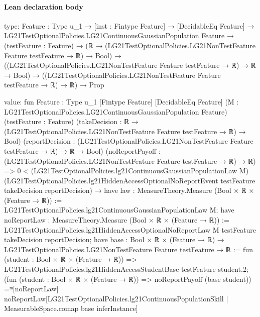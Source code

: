 \documentclass[10pt]{article}
\begin{document}
\paragraph{Lean declaration body}
\begin{ReviewVerbatim}
type:
{Feature : Type u_1} →
  [inst : Fintype Feature] →
    [DecidableEq Feature] →
      LG21TestOptionalPolicies.LG21ContinuousGaussianPopulation Feature →
        (testFeature : Feature) →
          (ℝ → (LG21TestOptionalPolicies.LG21NonTestFeature Feature testFeature → ℝ) → Bool) →
            ((LG21TestOptionalPolicies.LG21NonTestFeature Feature testFeature → ℝ) → ℝ → Bool) →
              ((LG21TestOptionalPolicies.LG21NonTestFeature Feature testFeature → ℝ) → ℝ) → Prop

value:
fun {Feature : Type u_1} [Fintype Feature] [DecidableEq Feature]
    (M : LG21TestOptionalPolicies.LG21ContinuousGaussianPopulation Feature) (testFeature : Feature)
    (takeDecision : ℝ → (LG21TestOptionalPolicies.LG21NonTestFeature Feature testFeature → ℝ) → Bool)
    (reportDecision : (LG21TestOptionalPolicies.LG21NonTestFeature Feature testFeature → ℝ) → ℝ → Bool)
    (noReportPayoff : (LG21TestOptionalPolicies.LG21NonTestFeature Feature testFeature → ℝ) → ℝ) =>
  0 <
      (LG21TestOptionalPolicies.lg21ContinuousGaussianPopulationLaw M)
        (LG21TestOptionalPolicies.lg21HiddenAccessOptionalNoReportEvent testFeature takeDecision reportDecision) →
    have law : MeasureTheory.Measure (Bool × ℝ × (Feature → ℝ)) :=
      LG21TestOptionalPolicies.lg21ContinuousGaussianPopulationLaw M;
    have noReportLaw : MeasureTheory.Measure (Bool × ℝ × (Feature → ℝ)) :=
      LG21TestOptionalPolicies.lg21HiddenAccessOptionalNoReportLaw M testFeature takeDecision reportDecision;
    have base : Bool × ℝ × (Feature → ℝ) → LG21TestOptionalPolicies.LG21NonTestFeature Feature testFeature → ℝ :=
      fun (student : Bool × ℝ × (Feature → ℝ)) =>
      LG21TestOptionalPolicies.lg21HiddenAccessStudentBase testFeature student.2;
    (fun (student : Bool × ℝ × (Feature → ℝ)) => noReportPayoff (base student)) =ᵐ[noReportLaw]
      noReportLaw[LG21TestOptionalPolicies.lg21ContinuousPopulationSkill | MeasurableSpace.comap base inferInstance]
\end{ReviewVerbatim}
\end{document}
